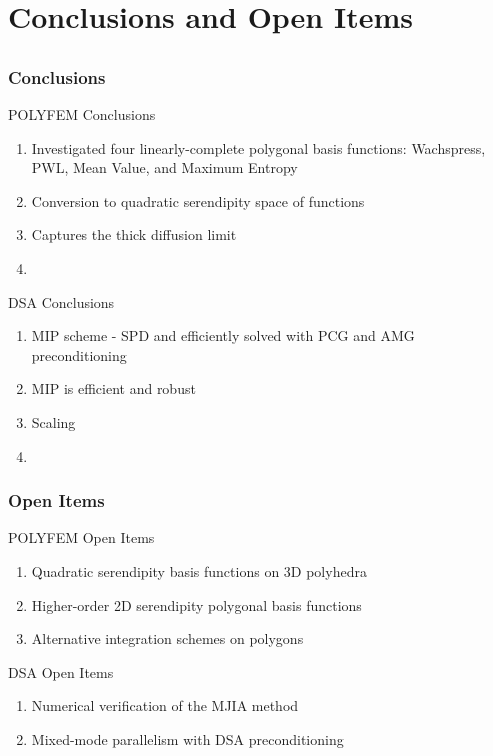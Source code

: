 \documentclass[compress,10pt]{beamer}
\begin{document}
\section{Conclusions and Open Items}
\subsection{}
\begin{frame}[t]\frametitle{Conclusions}
{
\begin{block}{POLYFEM Conclusions}
\begin{enumerate}
\item Investigated four linearly-complete polygonal basis functions: Wachspress, PWL, Mean Value, and Maximum Entropy
\item Conversion to quadratic serendipity space of functions
\item Captures the thick diffusion limit
\item 
\end{enumerate}
\end{block}
}
{
\begin{block}{DSA Conclusions}
\begin{enumerate}
\item MIP scheme - SPD and efficiently solved with PCG and AMG preconditioning
\item MIP is efficient and robust
\item Scaling 
\item 
\end{enumerate}
\end{block}
}
\end{frame}
\begin{frame}[t]\frametitle{Open Items}
\begin{block}{POLYFEM Open Items}
\begin{enumerate}
\item Quadratic serendipity basis functions on 3D polyhedra
\item Higher-order 2D serendipity polygonal basis functions
\item Alternative integration schemes on polygons
\end{enumerate}
\end{block}
\begin{block}{DSA Open Items}
\begin{enumerate}
\item Numerical verification of the MJIA method
\item Mixed-mode parallelism with DSA preconditioning
\end{enumerate}
\end{block}
\end{frame}
\end{document}
